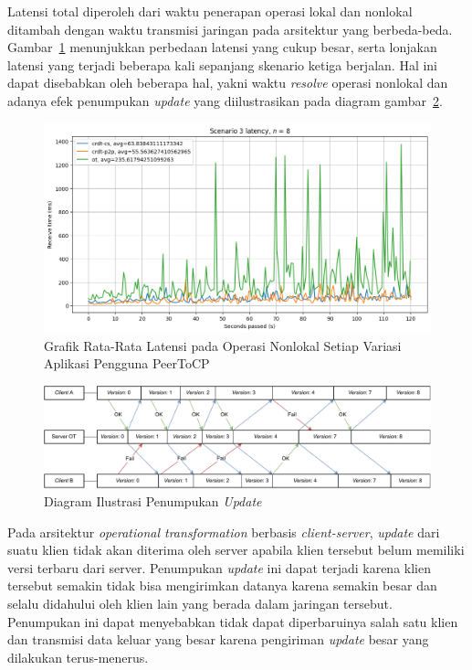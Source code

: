 Latensi total diperoleh dari waktu penerapan operasi lokal dan nonlokal ditambah dengan waktu transmisi jaringan pada arsitektur yang berbeda-beda. Gambar~\ref{fig:7-5} menunjukkan perbedaan latensi yang cukup besar, serta lonjakan latensi yang terjadi beberapa kali sepanjang skenario ketiga berjalan. Hal ini dapat disebabkan oleh beberapa hal, yakni waktu \textit{resolve} operasi nonlokal dan adanya efek penumpukan \textit{update} yang diilustrasikan pada diagram gambar~\ref{diagram:snowball}.

\begin{figure}
 \centering
 \includegraphics[width=15cm]{./assets/skripsi/benchmark-vis_cell_7_output_5}
 \caption{Grafik Rata-Rata Latensi pada Operasi Nonlokal Setiap Variasi Aplikasi Pengguna PeerToCP}
 \label{fig:7-5}
\end{figure}

\begin{figure}
 \centering
 \includegraphics[width=15cm]{./assets/skripsi/Snowball}
 \caption{Diagram Ilustrasi Penumpukan \textit{Update}}
 \label{diagram:snowball}
\end{figure}

Pada arsitektur \textit{operational transformation} berbasis \textit{client-server}, \textit{update} dari suatu klien tidak akan diterima oleh server apabila klien tersebut belum memiliki versi terbaru dari server. Penumpukan \textit{update} ini dapat terjadi karena klien tersebut semakin tidak bisa mengirimkan datanya karena semakin besar dan selalu didahului oleh klien lain yang berada dalam jaringan tersebut. Penumpukan ini dapat menyebabkan tidak dapat diperbaruinya salah satu klien dan transmisi data keluar yang besar karena pengiriman \textit{update} besar yang dilakukan terus-menerus.

